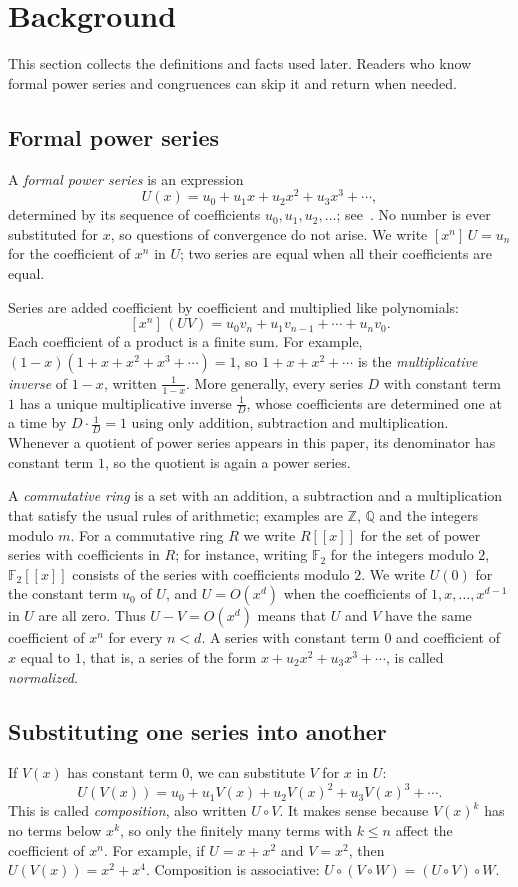 \documentclass[11pt,a4paper]{article}
\theoremstyle{definition}
\theoremstyle{remark}
\newcommand{\Z}{\mathbb{Z}}
\newcommand{\Q}{\mathbb{Q}}
\newcommand{\F}{\mathbb{F}}
\newcommand{\ps}[1]{#1[[x]]}
\newcommand{\coeff}[2]{[x^{#1}]\,#2}
\begin{document}
\section{Background}\label{sec:background}
This section collects the definitions and facts used later. Readers who know formal power series and congruences can skip it and return when needed.
\subsection{Formal power series}
A \emph{formal power series} is an expression
\[
U(x)=u_0+u_1x+u_2x^2+u_3x^3+\cdots ,
\]
determined by its sequence of coefficients $u_0,u_1,u_2,\dots$; see~\cite{niven,stanley}. No number is ever
substituted for $x$, so questions of convergence do not arise. We write $\coeff{n}{U}=u_n$ for the coefficient of $x^n$ in $U$; two series are equal
when all their coefficients are equal.

Series are added coefficient by coefficient and multiplied like polynomials:
\[
\coeff{n}{(UV)}=u_0v_n+u_1v_{n-1}+\cdots+u_nv_0 .
\]
Each coefficient of a product is a finite sum. For example, $(1-x)(1+x+x^2+x^3+\cdots)=1$, so $1+x+x^2+\cdots$ is
the \emph{multiplicative inverse} of $1-x$, written $\frac{1}{1-x}$. More generally, every series $D$ with constant term
$1$ has a unique multiplicative inverse $\frac1D$, whose coefficients are determined one at a time by $D\cdot\frac1D=1$
using only addition, subtraction and multiplication. Whenever a quotient of power series appears in this paper, its
denominator has constant term $1$, so the quotient is again a power series.

A \emph{commutative ring} is a set with an addition, a subtraction and a multiplication that satisfy the usual rules
of arithmetic; examples are $\Z$, $\Q$ and the integers modulo $m$. For a commutative ring $R$ we write $\ps{R}$ for
the set of power series with coefficients in $R$; for instance, writing $\F_2$ for the integers modulo $2$, $\ps{\F_2}$
consists of the series with coefficients modulo $2$. We write
$U(0)$ for the constant term $u_0$ of $U$, and $U=O(x^d)$ when the coefficients of $1,x,\dots,x^{d-1}$ in $U$ are all
zero. Thus $U-V=O(x^d)$ means that $U$ and $V$ have the same coefficient of $x^n$ for every $n<d$. A series with
constant term $0$ and coefficient of $x$ equal to $1$, that is, a series of the form $x+u_2x^2+u_3x^3+\cdots$, is
called \emph{normalized}.

\subsection{Substituting one series into another}
If $V(x)$ has constant term $0$, we can substitute $V$ for $x$ in $U$:
\[
U(V(x))=u_0+u_1V(x)+u_2V(x)^2+u_3V(x)^3+\cdots .
\]
This is called \emph{composition}, also written $U\circ V$. It makes sense because $V(x)^k$ has no terms below $x^k$,
so only the finitely many terms with $k\le n$ affect the coefficient of $x^n$. For example, if $U=x+x^2$ and $V=x^2$, then
$U(V(x))=x^2+x^4$. Composition is associative: $U\circ(V\circ W)=(U\circ V)\circ W$.
\end{document}

